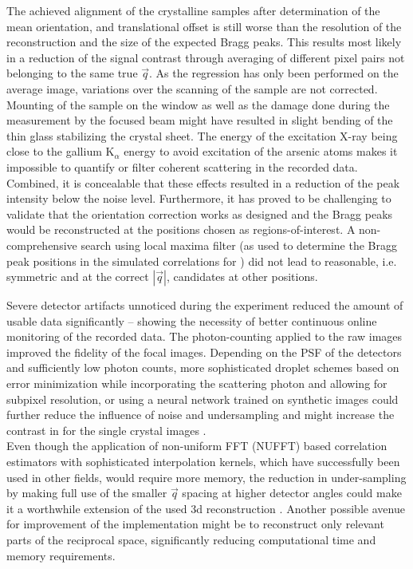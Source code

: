 The achieved alignment of the crystalline samples after determination of the mean orientation, and translational offset is still worse than the resolution of the reconstruction and the size of the expected Bragg peaks. This results  most likely in a reduction of the signal contrast through averaging of different pixel pairs not belonging to the same true $\vec{q}$. As the regression has only been performed on the average image, variations over the scanning of the sample are not corrected. Mounting of the sample on the window as well as the damage done during the measurement by the focused beam might have resulted in slight bending of the thin glass stabilizing the crystal sheet. The energy of the excitation X-ray being close to the gallium K$_\alpha$ energy to avoid excitation of the arsenic atoms makes it impossible to quantify or filter coherent scattering in the recorded data. Combined, it is concealable that these effects resulted in a reduction of the peak intensity below the noise level. Furthermore, it has proved to be challenging to validate that the orientation correction works as designed and the Bragg peaks would be reconstructed at the positions chosen as regions-of-interest. A non-comprehensive search using local maxima filter (as used to determine the Bragg peak positions in the simulated correlations for ) did not lead to reasonable, i.e. symmetric and at the correct $\left|\vec{q}\right|$, candidates at other positions.

Severe detector artifacts unnoticed during the experiment reduced the amount of usable data significantly -- showing the necessity of better continuous online monitoring of the recorded data. The photon-counting applied to the raw images improved the fidelity of the focal images. Depending on the PSF of the detectors and sufficiently low photon counts, more sophisticated droplet schemes based on error minimization while incorporating the scattering photon and allowing for subpixel resolution, or using a neural network trained on synthetic images could further reduce the influence of noise and undersampling and might increase the contrast in for the single crystal images \cite{baumann2018,collaboration2014,schayck2020,sun2020}.\\
Even though the application of non-uniform FFT (NUFFT) based correlation estimators with sophisticated interpolation kernels, which have successfully been used in other fields, would require more memory, the reduction in under-sampling by making full use of the smaller $\vec{q}$ spacing at higher detector angles could make it a worthwhile extension of the used 3d reconstruction \cite{laguna1998,yang2008,chang2020}. Another possible avenue for improvement of the implementation might be to reconstruct only relevant parts of the reciprocal space, significantly reducing computational time and memory requirements. 

